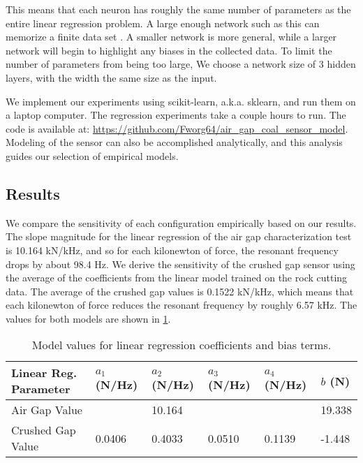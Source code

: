 This means that each neuron has roughly the same number of parameters as the entire linear regression problem.
A large enough network such as this can memorize a finite data set \cite{AroraBMM16}.
A smaller network is more general, while a larger network will begin to highlight any biases in the collected data.
To limit the number of parameters from being too large,
We choose a network size of 3 hidden layers, with the width the same size as the input. 

We implement our experiments using scikit-learn, a.k.a. sklearn, \cite{JMLR:v12:pedregosa11a} 
and run them on a laptop computer. The regression experiments take a couple hours to run.
The code is available at: \url{https://github.com/Fworg64/air_gap_coal_sensor_model}.
Modeling of the sensor can also be accomplished analytically, 
and this analysis guides our selection of empirical models.

\subsection{Results}

We compare the sensitivity of each configuration empirically based on our results.
The slope magnitude for the linear regression of the air gap characterization test is
10.164 kN/kHz, and so for each kilonewton of force, the resonant frequency drops by about
98.4 Hz. We derive the sensitivity of the crushed gap sensor using the average of the 
coefficients from the linear model trained on the rock cutting data.
The average of the crushed gap values is 0.1522 kN/kHz, which means that each kilonewton of force
reduces the resonant frequency by roughly 6.57 kHz.
The values for both models are shown in \ref{tab:lin}. 

\begin{table}[h]
\centering
\caption{Model values for linear regression coefficients and bias terms.}
\label{tab:lin}
\begin{tabular}{|l|l|l|l|l|l|} 
\hline
Linear Reg. Parameter & $a_1$ (N/Hz) & $a_2$ (N/Hz) & $a_3$ (N/Hz)  & $a_4$ (N/Hz) & $b$ (N)     \\ \hline
Air Gap Value         & & 10.164 &  &  &  19.338  \\ \hline
Crushed Gap Value             & 0.0406 & 0.4033 & 0.0510 & 0.1139 &  -1.448  \\ \hline
\end{tabular}
\end{table}

